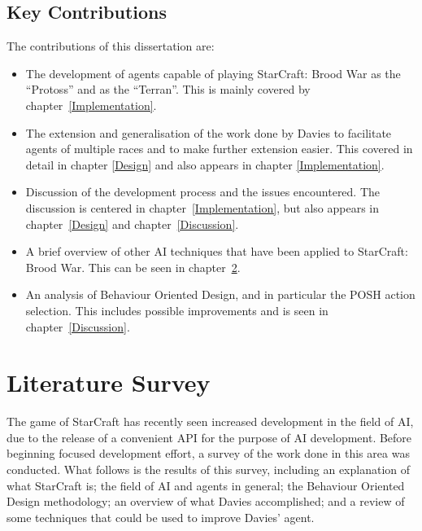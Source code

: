 \documentclass[11pt,openright,a4paper]{report}
\begin{document}
\section{Key Contributions}
The contributions of this dissertation are:
\begin{itemize}
\item{The development of agents capable of playing StarCraft: Brood War as the ``Protoss''  and as the ``Terran''. This is mainly covered by chapter~\ref{Implementation}.}
\item{The extension and generalisation of the work done by Davies to facilitate agents of multiple races and to make further extension easier. This covered in detail in chapter \ref{Design} and also appears in chapter \ref{Implementation}.}
\item{Discussion of the development process and the issues encountered. The discussion is centered in chapter~\ref{Implementation}, but also appears in chapter~\ref{Design} and chapter~\ref{Discussion}.}
\item{A brief overview of other AI techniques that have been applied to StarCraft: Brood War. This can be seen in chapter~\ref{LitSrvy}.}
\item{An analysis of Behaviour Oriented Design, and in particular the POSH action selection. This includes possible improvements and is seen in chapter~\ref{Discussion}.}
\end{itemize}

\chapter{Literature Survey}
\label{LitSrvy}
The game of StarCraft has recently seen increased development in the field of AI, due to the release of a convenient API for the purpose of AI development. Before beginning focused development effort, a survey of the work done in this area was conducted. What follows is the results of this survey, including an explanation of what StarCraft is; the field of AI and agents in general; the Behaviour Oriented Design methodology; an overview of what Davies accomplished; and a review of some techniques that could be used to improve Davies' agent.
\end{document}

